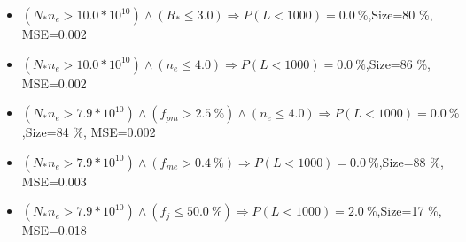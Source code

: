 \documentclass[numbered]{CSL}
\begin{document}
\begin{itemize}
\item $(N_* n_e > 10.0 * 10^{10}) \land (R_* \leq 3.0) \Rightarrow P(L < 1 000) = 0.0~\%$,\hfill Size=80 \%, MSE=0.002
\item $(N_* n_e > 10.0 * 10^{10}) \land (n_e \leq 4.0) \Rightarrow P(L < 1 000) = 0.0~\%$,\hfill Size=86 \%, MSE=0.002
\item $(N_* n_e > 7.9 * 10^{10}) \land (f_{pm} > 2.5~\%) \land (n_e \leq 4.0) \Rightarrow P(L < 1 000) = 0.0~\%$,\hfill Size=84 \%, MSE=0.002
\item $(N_* n_e > 7.9 * 10^{10}) \land (f_{me} > 0.4~\%) \Rightarrow P(L < 1 000) = 0.0~\%$,\hfill Size=88 \%, MSE=0.003
\item $(N_* n_e > 7.9 * 10^{10}) \land (f_j \leq 50.0~\%) \Rightarrow P(L < 1 000) = 2.0~\%$,\hfill Size=17 \%, MSE=0.018
\end{itemize}
\end{document}
